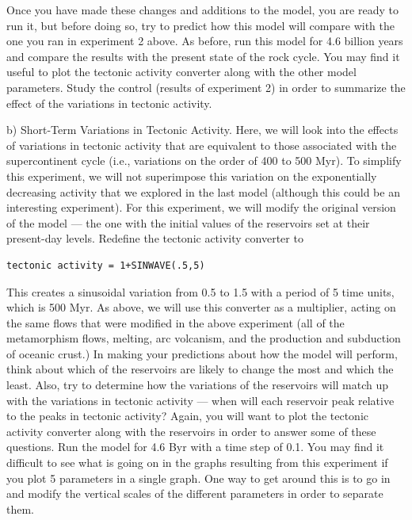 \documentclass[11pt,letterpaper]{article}
\begin{document}
Once you have made these changes and additions to the model, you are ready to run it, but before doing so, try to predict how this model will compare with the one you ran in experiment 2 above. As before, run this model for 4.6 billion years and compare the results with the present state of the rock cycle. You may find it useful to plot the tectonic activity converter along with the other model parameters. Study the control (results of experiment 2) in order to summarize the effect of the variations in tectonic activity.
\bigskip 

b) Short-Term Variations in Tectonic Activity.
Here, we will look into the effects of variations in tectonic activity that are equivalent to those associated with the supercontinent cycle (i.e., variations on the order of 400 to 500 Myr). To simplify this experiment, we will not superimpose this variation on the exponentially decreasing activity that we explored in the last model (although this could be an interesting experiment). For this experiment, we will modify the original version of the model --- the one with the initial values of the reservoirs set at their present-day levels. Redefine the tectonic activity converter to
\begin{verbatim}
tectonic activity = 1+SINWAVE(.5,5)
\end{verbatim}

This creates a sinusoidal variation from 0.5 to 1.5 with a period of 5 time units, which is 500 Myr. As above, we will use this converter as a multiplier, acting on the same flows that were modified in the above experiment (all of the metamorphism flows, melting, arc volcanism, and the production and subduction of oceanic crust.) In making your predictions about how the model will perform, think about which of the reservoirs are likely to change the most and which the least. Also, try to determine how the variations of the reservoirs will match up with the variations in tectonic activity --- when will each reservoir peak relative to the peaks in tectonic activity? Again, you will want to plot the tectonic activity converter along with the reservoirs in order to answer some of these questions. Run the model for 4.6 Byr with a time step of 0.1. You may find it difficult to see what is going on in the graphs resulting from this experiment if you plot 5 parameters in a single graph. One way to get around this is to go in and modify the vertical scales of the different parameters in order to separate them.
\end{document}
